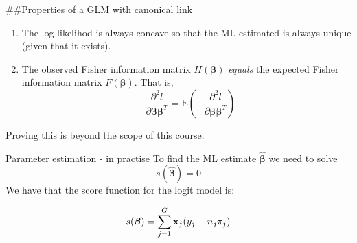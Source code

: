 \documentclass[
  ignorenonframetext,
]{beamer}
\begin{document}
\begin{frame}
\#\#Properties of a GLM with canonical link

\begin{enumerate}
\item
  The log-likelihod is always concave so that the ML estimated is always
  unique (given that it exists).
\item
  The observed Fisher information matrix \(H(\boldsymbol{\beta})\)
  \emph{equals} the expected Fisher information matrix
  \(F(\boldsymbol{\beta})\). That is,
  \[-\frac{\partial^2 l}{\partial \boldsymbol{\beta} \boldsymbol{\beta}^T}=\text{E}(-\frac{\partial^2 l}{\partial \boldsymbol{\beta} \boldsymbol{\beta}^T})\]
\end{enumerate}

Proving this is beyond the scope of this course.
\end{frame}

\begin{frame}{Parameter estimation - in practise}
\label{parameter-estimation---in-practise}
To find the ML estimate \(\hat{\boldsymbol{\beta}}\) we need to solve
\[s(\hat{\boldsymbol{\beta}})=0\] We have that the score function for
the logit model is:

\[
s(\boldsymbol{\beta})=\sum_{j=1}^G {\bf x}_j (y_j-n_j\pi_j)
\]
\end{frame}

\begin{frame}
\end{frame}
\end{document}
